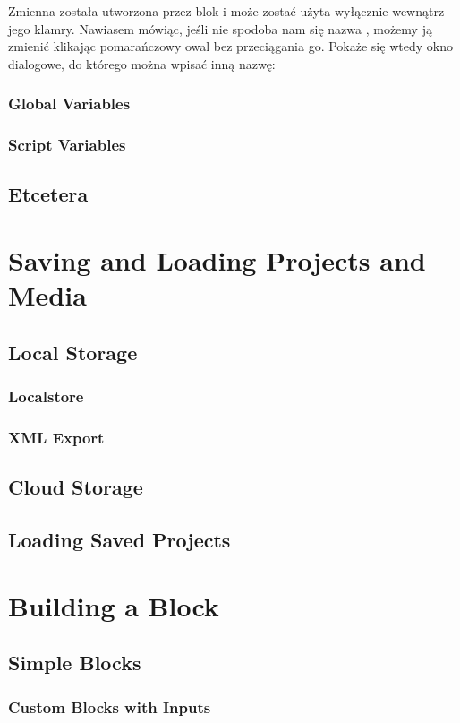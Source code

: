 \documentclass{report}
\begin{document}
Zmienna  została utworzona przez blok  i może zostać użyta wyłącznie wewnątrz jego klamry. Nawiasem mówiąc, jeśli nie spodoba nam się nazwa , możemy ją zmienić klikając pomarańczowy owal bez przeciągania go. Pokaże się wtedy okno dialogowe, do którego można wpisać inną nazwę:

\subsection{Global Variables}
\subsection{Script Variables}
\section{Etcetera}
\chapter{Saving and Loading Projects and Media}
\section{Local Storage}
\subsection{Localstore}
\subsection{XML Export}
\section{Cloud Storage}
\section{Loading Saved Projects}
\chapter{Building a Block}
\section{Simple Blocks}
\subsection{Custom Blocks with Inputs}
\end{document}
